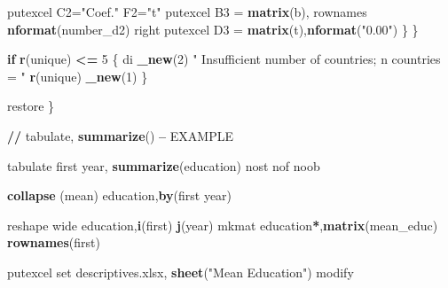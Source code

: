 \documentclass[
  12pt,
]{article}
\newenvironment{Shaded}{\begin{snugshade}}{\end{snugshade}}
\newcommand{\ControlFlowTok}[1]{\textcolor[rgb]{0.13,0.29,0.53}{\textbf{#1}}}
\newcommand{\DecValTok}[1]{\textcolor[rgb]{0.00,0.00,0.81}{#1}}
\newcommand{\ErrorTok}[1]{\textcolor[rgb]{0.64,0.00,0.00}{\textbf{#1}}}
\newcommand{\KeywordTok}[1]{\textcolor[rgb]{0.13,0.29,0.53}{\textbf{#1}}}
\newcommand{\NormalTok}[1]{#1}
\newcommand{\OperatorTok}[1]{\textcolor[rgb]{0.81,0.36,0.00}{\textbf{#1}}}
\newcommand{\StringTok}[1]{\textcolor[rgb]{0.31,0.60,0.02}{#1}}
\begin{document}
\begin{Shaded}
\begin{Highlighting}[]
{\NormalTok{                        putexcel C2=}\StringTok{"Coef."}\NormalTok{ F2=}\StringTok{"t"}
\NormalTok{                        putexcel B3 =}\StringTok{ }\KeywordTok{matrix}\NormalTok{(b), rownames }\KeywordTok{nformat}\NormalTok{(number_d2) right}
\NormalTok{                        putexcel D3 =}\StringTok{ }\KeywordTok{matrix}\NormalTok{(t),}\KeywordTok{nformat}\NormalTok{(}\StringTok{"0.00"}\NormalTok{)}
\NormalTok{                \}}
\NormalTok{            \}}
            
            \ControlFlowTok{if} \KeywordTok{r}\NormalTok{(unique) }\OperatorTok{<=}\StringTok{ }\DecValTok{5}\NormalTok{ \{}
\NormalTok{                di }\KeywordTok{_new}\NormalTok{(}\DecValTok{2}\NormalTok{) }\StringTok{"    Insufficient number of countries; n countries = "} \KeywordTok{r}\NormalTok{(unique) }\KeywordTok{_new}\NormalTok{(}\DecValTok{1}\NormalTok{)}
\NormalTok{            \}}
            
\NormalTok{        restore}
\NormalTok{\}}

\OperatorTok{/}\ErrorTok{/}\StringTok{ }\NormalTok{tabulate, }\KeywordTok{summarize}\NormalTok{() }\OperatorTok{--}\StringTok{ }\NormalTok{EXAMPLE}

\NormalTok{tabulate first year, }\KeywordTok{summarize}\NormalTok{(education) nost nof noob}

\KeywordTok{collapse}\NormalTok{ (mean) education,}\KeywordTok{by}\NormalTok{(first year)}

\NormalTok{reshape wide education,}\KeywordTok{i}\NormalTok{(first) }\KeywordTok{j}\NormalTok{(year)}
\NormalTok{mkmat education}\OperatorTok{*}\NormalTok{,}\KeywordTok{matrix}\NormalTok{(mean_educ) }\KeywordTok{rownames}\NormalTok{(first)}

\NormalTok{putexcel set descriptives.xlsx, }\KeywordTok{sheet}\NormalTok{(}\StringTok{"Mean Education"}\NormalTok{) modify}

}
\end{Highlighting}
\end{Shaded}
\end{document}
